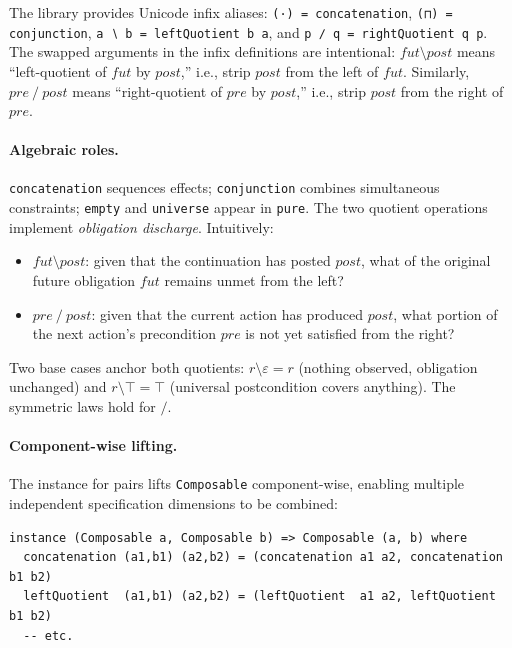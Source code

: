 \documentclass[acmsmall,screen]{acmart}
\newcommand{\pre}{\mathit{pre}}
\newcommand{\post}{\mathit{post}}
\newcommand{\fut}{\mathit{fut}}
\newcommand{\lquot}{\mathbin{\setminus}}   %
\newcommand{\rquot}{\mathbin{/}}           %
\begin{document}
\noindent
The library provides Unicode infix aliases:
\lstinline{(·) = concatenation},
\lstinline{(⊓) = conjunction},
\lstinline{a ∖ b = leftQuotient b a}, and
\lstinline{p ∕ q = rightQuotient q p}.
The swapped arguments in the infix definitions are intentional:
$\fut \lquot \post$ means ``left-quotient of $\fut$ by $\post$,'' i.e.,
strip $\post$ from the left of $\fut$.
Similarly, $\pre \rquot \post$ means ``right-quotient of $\pre$ by $\post$,''
i.e., strip $\post$ from the right of $\pre$.

\paragraph{Algebraic roles.}
\lstinline{concatenation} sequences effects;
\lstinline{conjunction} combines simultaneous constraints;
\lstinline{empty} and \lstinline{universe} appear in \lstinline{pure}.
The two quotient operations implement \emph{obligation discharge}.
Intuitively:

\begin{itemize}
\item $\fut \lquot \post$: given that the continuation has posted
  $\post$, what of the original future obligation $\fut$ remains
  unmet from the left?

\item $\pre \rquot \post$: given that the current action has produced
  $\post$, what portion of the next action's precondition $\pre$ is not
  yet satisfied from the right?
\end{itemize}

\noindent
Two base cases anchor both quotients:
$r \lquot \varepsilon = r$ (nothing observed, obligation unchanged) and
$r \lquot \top = \top$ (universal postcondition covers anything).
The symmetric laws hold for $\rquot$.

\paragraph{Component-wise lifting.}
The instance for pairs lifts \lstinline{Composable} component-wise,
enabling multiple independent specification dimensions to be combined:

\begin{lstlisting}
instance (Composable a, Composable b) => Composable (a, b) where
  concatenation (a1,b1) (a2,b2) = (concatenation a1 a2, concatenation b1 b2)
  leftQuotient  (a1,b1) (a2,b2) = (leftQuotient  a1 a2, leftQuotient  b1 b2)
  -- etc.
\end{lstlisting}
\end{document}
